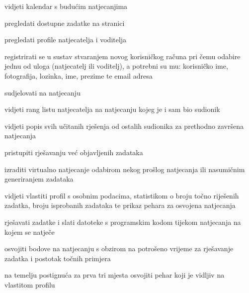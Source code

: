 			
			\begin{packed_enum}
				\item  {}
				
				\begin{packed_enum}
					
					\item vidjeti kalendar s budućim natjecanjima
					\item pregledati dostupne zadatke na stranici
					\item pregledati profile natjecatelja i voditelja
					\item registrirati se u sustav stvaranjem novog korisničkog računa pri čemu odabire jednu od uloga (natjecatelj ili voditelj), a potrebni su mu: korisničko ime, fotografija, lozinka, ime, prezime te email adresa
					
				\end{packed_enum}
			
				\item  {}
				
				\begin{packed_enum}
					
					\item sudjelovati na natjecanju
					\item vidjeti rang listu natjecatelja na natjecanju kojeg je i sam bio sudionik
					\item vidjeti popis svih učitanih rješenja od ostalih sudionika za prethodno završena natjecanja
					\item pristupiti rješavanju već objavljenih zadataka
					\item izraditi virtualno natjecanje odabirom nekog prošlog natjecanja ili nasumičnim generiranjem zadataka 
					\item vidjeti vlastiti profil s osobnim podacima, statistikom o broju točno riješenih zadatka, broju isprobanih zadataka te prikaz pehara za osvojena natjecanja
					
				\end{packed_enum}
				
				\item  {}
				
				\begin{packed_enum}
					
					\item rješavati zadatke i slati datoteke s programskim kodom tijekom natjecanja na kojem se natječe 
					\item osvojiti bodove na natjecanju s obzirom na potrošeno vrijeme za rješavanje zadatka i postotak točnih primjera 
					\item na temelju postignuća za prva tri mjesta osvojiti pehar koji je vidljiv na vlastitom profilu
					

\end{packed_enum}
\end{packed_enum}
